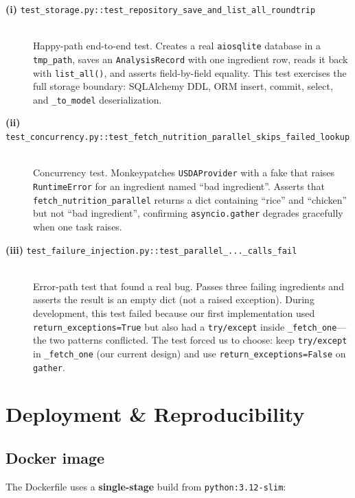\documentclass[11pt,a4paper]{article}
\begin{document}
\begin{description}
    \item[\textmd{\textbf{(i)} \texttt{test\_storage.py::test\_repository\_save\_and\_list\_all\_roundtrip}}] \hfill \\
    Happy-path end-to-end test. Creates a real \texttt{aiosqlite} database in a \texttt{tmp\_path}, saves an \texttt{AnalysisRecord} with one ingredient row, reads it back with \texttt{list\_all()}, and asserts field-by-field equality. This test exercises the full storage boundary: SQLAlchemy DDL, ORM insert, commit, select, and \texttt{\_to\_model} deserialization.

    \item[\textmd{\textbf{(ii)} \texttt{test\_concurrency.py::test\_fetch\_nutrition\_parallel\_skips\_failed\_lookup}}] \hfill \\
    Concurrency test. Monkeypatches \texttt{USDAProvider} with a fake that raises \texttt{RuntimeError} for an ingredient named ``bad ingredient''. Asserts that \texttt{fetch\_nutrition\_parallel} returns a dict containing ``rice'' and ``chicken'' but not ``bad ingredient'', confirming \texttt{asyncio.gather} degrades gracefully when one task raises.

    \item[\textmd{\textbf{(iii)} \texttt{test\_failure\_injection.py::test\_parallel\_...\_calls\_fail}}] \hfill \\
    Error-path test that found a real bug. Passes three failing ingredients and asserts the result is an empty dict (not a raised exception). During development, this test failed because our first implementation used \texttt{return\_exceptions=True} but also had a \texttt{try/except} inside \texttt{\_fetch\_one}---the two patterns conflicted. The test forced us to choose: keep \texttt{try/except} in \texttt{\_fetch\_one} (our current design) and use \texttt{return\_exceptions=False} on \texttt{gather}.
\end{description}
\section{Deployment \& Reproducibility}\label{sec:deploy}

\subsection{Docker image}

The Dockerfile uses a \textbf{single-stage} build from \texttt{python:3.12-slim}:
\end{document}
